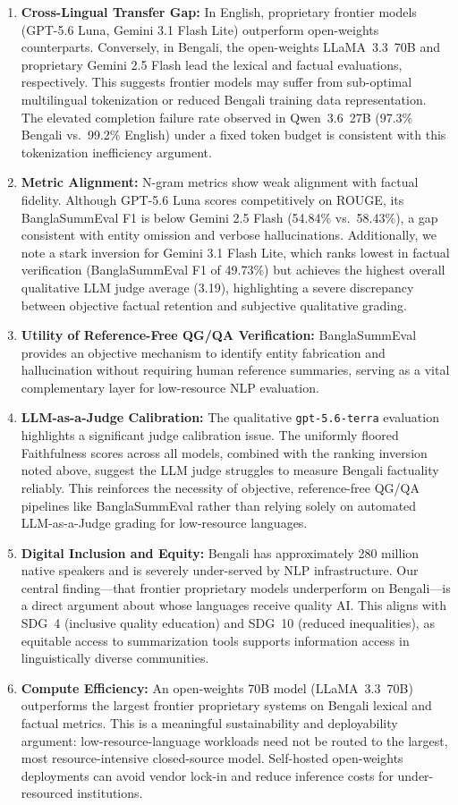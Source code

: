 \documentclass[runningheads]{llncs}
\begin{document}
\begin{enumerate}
    \item \textbf{Cross-Lingual Transfer Gap:} In English, proprietary frontier models (GPT-5.6 Luna, Gemini 3.1 Flash Lite) outperform open-weights counterparts. Conversely, in Bengali, the open-weights LLaMA~3.3~70B and proprietary Gemini 2.5 Flash lead the lexical and factual evaluations, respectively. This suggests frontier models may suffer from sub-optimal multilingual tokenization or reduced Bengali training data representation. The elevated completion failure rate observed in Qwen~3.6~27B (97.3\% Bengali vs.\ 99.2\% English) under a fixed token budget is consistent with this tokenization inefficiency argument.
    \item \textbf{Metric Alignment:} N-gram metrics show weak alignment with factual fidelity. Although GPT-5.6 Luna scores competitively on ROUGE, its BanglaSummEval F1 is below Gemini 2.5 Flash (54.84\% vs.~58.43\%), a gap consistent with entity omission and verbose hallucinations. Additionally, we note a stark inversion for Gemini 3.1 Flash Lite, which ranks lowest in factual verification (BanglaSummEval F1 of 49.73\%) but achieves the highest overall qualitative LLM judge average (3.19), highlighting a severe discrepancy between objective factual retention and subjective qualitative grading.
    \item \textbf{Utility of Reference-Free QG/QA Verification:} BanglaSummEval provides an objective mechanism to identify entity fabrication and hallucination without requiring human reference summaries, serving as a vital complementary layer for low-resource NLP evaluation.
    \item \textbf{LLM-as-a-Judge Calibration:} The qualitative \texttt{gpt-5.6-terra} evaluation highlights a significant judge calibration issue. The uniformly floored Faithfulness scores across all models, combined with the ranking inversion noted above, suggest the LLM judge struggles to measure Bengali factuality reliably. This reinforces the necessity of objective, reference-free QG/QA pipelines like BanglaSummEval rather than relying solely on automated LLM-as-a-Judge grading for low-resource languages.
    \item \textbf{Digital Inclusion and Equity:} Bengali has approximately 280 million native speakers and is severely under-served by NLP infrastructure. Our central finding---that frontier proprietary models underperform on Bengali---is a direct argument about whose languages receive quality AI. This aligns with SDG~4 (inclusive quality education) and SDG~10 (reduced inequalities), as equitable access to summarization tools supports information access in linguistically diverse communities.
    \item \textbf{Compute Efficiency:} An open-weights 70B model (LLaMA~3.3~70B) outperforms the largest frontier proprietary systems on Bengali lexical and factual metrics. This is a meaningful sustainability and deployability argument: low-resource-language workloads need not be routed to the largest, most resource-intensive closed-source model. Self-hosted open-weights deployments can avoid vendor lock-in and reduce inference costs for under-resourced institutions.
\end{enumerate}
\end{document}
